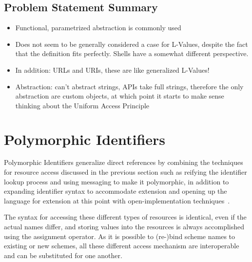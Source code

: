\documentclass[preprint]{sigplanconf}
\begin{document}
\subsection{Problem Statement Summary}



\begin{itemize}
\item Functional, parametrized abstraction is commonly used
\item Does not seem to be generally considered a case for L-Values, despite
	the fact that the definition fits perfectly.  Shells have a somewhat different perspective.
\item In addition: URLs and URIs, these are like generalized L-Values!
\item Abstraction:  can't abstract strings, APIs take full strings, therefore the only
	abstraction are custom objects, at which point it starts to make sense thinking
	about the Uniform Access Principle
\end{itemize}





\section{Polymorphic Identifiers}
\label{polymorphic-identifiers}

Polymorphic Identifiers generalize direct references by combining the techniques for resource access
discussed in the previous section such as reifying the identifier lookup process and using messaging 
to make it polymorphic, in addition to expanding identifier syntax to accommodate extension and 
opening up the language for extension at this point  with open-implementation techniques~\cite{OpenImplementations}.




The syntax for accessing these different types of resources is identical, even if the actual
names differ, and storing values into the resources is always accomplished using the assignment operator.
As it is possible to (re-)bind scheme names to existing or new schemes, all these different access 
mechanism are interoperable and can be substituted for one another.
\end{document}

